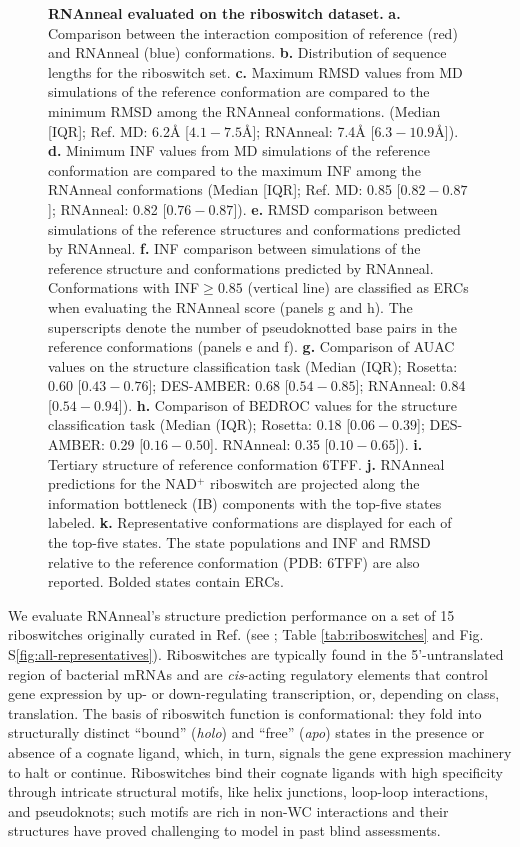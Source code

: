 \documentclass[%
aip,
 amsmath,amssymb,
reprint,%
onecolumn,
]{revtex4-1}
\begin{document}
{\begin{figure}[htbp!]
    \caption{{\bf RNAnneal evaluated on the riboswitch dataset.} {\bf a.} Comparison between the interaction composition of reference (red) and RNAnneal (blue) conformations. {\bf b.} Distribution of sequence lengths for the riboswitch set. {\bf c.} Maximum RMSD values from MD simulations of the reference conformation are compared to the minimum RMSD among the RNAnneal conformations. (Median [IQR]; Ref. MD: 6.2{\AA} [$4.1-7.5${\AA}]; RNAnneal: 7.4{\AA} [$6.3-10.9${\AA}]). {\bf d.} Minimum INF values from MD simulations of the reference conformation are compared to the maximum INF among the RNAnneal conformations (Median [IQR]; Ref. MD: 0.85 [$0.82-0.87$]; RNAnneal: 0.82 [$0.76-0.87$]). {\bf e.} RMSD comparison between simulations of the reference structures and conformations predicted by RNAnneal. {\bf f.} INF comparison between simulations of the reference structure and conformations predicted by RNAnneal. Conformations with INF$\geq0.85$ (vertical line) are classified as ERCs when evaluating the RNAnneal score (panels g and h). The superscripts denote the number of pseudoknotted base pairs in the reference conformations (panels e and f). {\bf g.} Comparison of AUAC values on the structure classification task (Median (IQR); Rosetta: 0.60 [$0.43-0.76$]; DES-AMBER: 0.68 [$0.54-0.85$]; RNAnneal: 0.84 [$0.54-0.94$]). {\bf h.} Comparison of BEDROC values for the structure classification task (Median (IQR); Rosetta: 0.18 [$0.06-0.39$]; DES-AMBER: 0.29 [$0.16-0.50$]. RNAnneal: 0.35 [$0.10-0.65$]). {\bf i.} Tertiary structure of reference conformation 6TFF. {\bf j.} RNAnneal predictions for the NAD$^+$ riboswitch are projected along the information bottleneck (IB) components with the top-five states labeled. {\bf k.} Representative conformations are displayed for each of the top-five states. The state populations and INF and RMSD relative to the reference conformation (PDB: 6TFF) are also reported. Bolded states contain ERCs.}
    \label{fig:results}%
\end{figure}


We evaluate RNAnneal's structure prediction performance on a set of 15 riboswitches originally curated in Ref.\cite{townshend2021geometric} (see ; Table \ref{tab:riboswitches} and Fig. S\ref{fig:all-representatives}). Riboswitches are typically found in the 5'-untranslated region of bacterial mRNAs and are {\it cis}-acting regulatory elements that control gene expression by up- or down-regulating transcription, or, depending on class, translation.\cite{huang2025some} The basis of riboswitch function is conformational: they fold into structurally distinct ``bound'' ({\it holo}) and ``free'' ({\it apo}) states in the presence or absence of a cognate ligand, which, in turn, signals the gene expression machinery to halt or continue. Riboswitches bind their cognate ligands with high specificity through intricate structural motifs, like helix junctions, loop-loop interactions, and pseudoknots; such motifs are rich in non-WC interactions and their structures have proved challenging to model in past blind assessments.\cite{das2023assessment,bu2025rna,kretsch2025assessment} 

}
\end{document}
